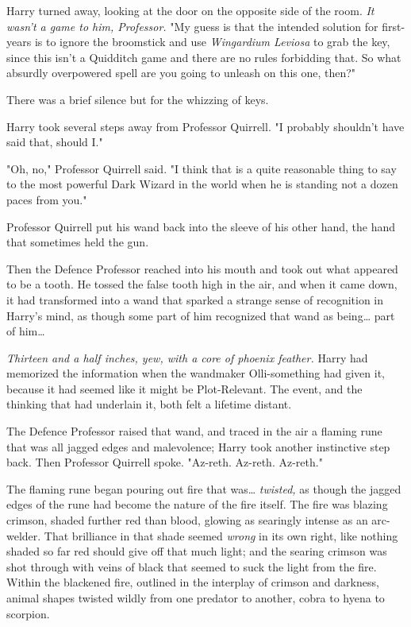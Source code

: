 Harry turned away, looking at the door on the opposite side of the room.
\emph{It wasn't a game to him, Professor.} "My guess is that the intended
solution for first-years is to ignore the broomstick and use \emph{Wingardium
Leviosa} to grab the key, since this isn't a Quidditch game and there are no
rules forbidding that. So what absurdly overpowered spell are you going to
unleash on this one, then?"

There was a brief silence but for the whizzing of keys.

Harry took several steps away from Professor Quirrell. "I probably shouldn't
have said that, should I."

"Oh, no," Professor Quirrell said. "I think that is a quite reasonable thing to
say to the most powerful Dark Wizard in the world when he is standing not a
dozen paces from you."

Professor Quirrell put his wand back into the sleeve of his other hand, the
hand that sometimes held the gun.

Then the Defence Professor reached into his mouth and took out what appeared to
be a tooth. He tossed the false tooth high in the air, and when it came down,
it had transformed into a wand that sparked a strange sense of recognition in
Harry's mind, as though some part of him recognized that wand as being{\ldots}
part of him{\ldots}

\emph{Thirteen and a half inches, yew, with a core of phoenix feather.} Harry
had memorized the information when the wandmaker Olli-something had given it,
because it had seemed like it might be Plot-Relevant. The event, and the
thinking that had underlain it, both felt a lifetime distant.

The Defence Professor raised that wand, and traced in the air a flaming rune
that was all jagged edges and malevolence; Harry took another instinctive step
back. Then Professor Quirrell spoke. "Az-reth. Az-reth. Az-reth."

The flaming rune began pouring out fire that was{\ldots} \emph{twisted,} as
though the jagged edges of the rune had become the nature of the fire itself.
The fire was blazing crimson, shaded further red than blood, glowing as
searingly intense as an arc-welder. That brilliance in that shade seemed
\emph{wrong} in its own right, like nothing shaded so far red should give off
that much light; and the searing crimson was shot through with veins of black
that seemed to suck the light from the fire. Within the blackened fire,
outlined in the interplay of crimson and darkness, animal shapes twisted wildly
from one predator to another, cobra to hyena to scorpion.

